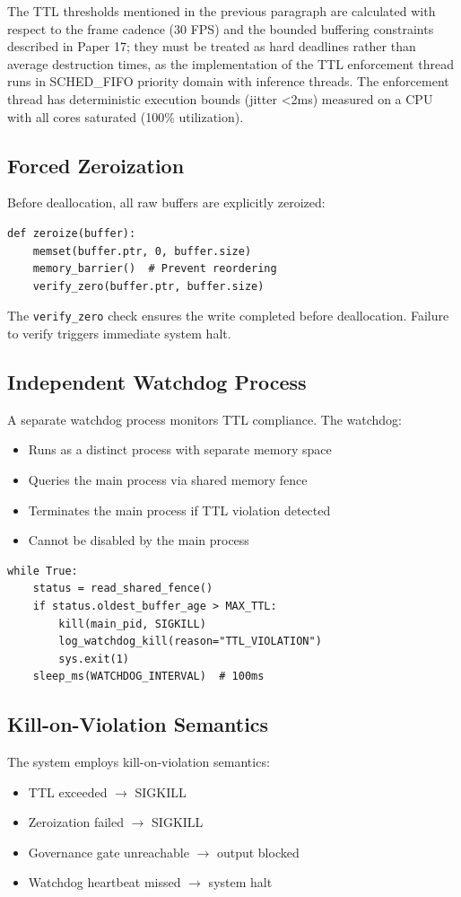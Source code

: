 \documentclass[conference]{IEEEtran}
\begin{document}
The TTL thresholds mentioned in the previous paragraph are calculated with respect to the frame cadence (30 FPS) and the bounded buffering constraints described in Paper 17; they must be treated as hard deadlines rather than average destruction times, as the implementation of the TTL enforcement thread runs in SCHED\_FIFO priority domain with inference threads. The enforcement thread has deterministic execution bounds (jitter <2ms) measured on a CPU with all cores saturated (100\% utilization).

\subsection{Forced Zeroization}
Before deallocation, all raw buffers are explicitly zeroized:

\begin{lstlisting}[caption={Zeroization Procedure}]
def zeroize(buffer):
    memset(buffer.ptr, 0, buffer.size)
    memory_barrier()  # Prevent reordering
    verify_zero(buffer.ptr, buffer.size)
\end{lstlisting}

The \texttt{verify\_zero} check ensures the write completed before deallocation. Failure to verify triggers immediate system halt.

\subsection{Independent Watchdog Process}
A separate watchdog process monitors TTL compliance. The watchdog:
\begin{itemize}
    \item Runs as a distinct process with separate memory space
    \item Queries the main process via shared memory fence
    \item Terminates the main process if TTL violation detected
    \item Cannot be disabled by the main process
\end{itemize}

\begin{lstlisting}[caption={Watchdog Logic}]
while True:
    status = read_shared_fence()
    if status.oldest_buffer_age > MAX_TTL:
        kill(main_pid, SIGKILL)
        log_watchdog_kill(reason="TTL_VIOLATION")
        sys.exit(1)
    sleep_ms(WATCHDOG_INTERVAL)  # 100ms
\end{lstlisting}

\subsection{Kill-on-Violation Semantics}
The system employs kill-on-violation semantics:
\begin{itemize}
    \item TTL exceeded $\rightarrow$ SIGKILL
    \item Zeroization failed $\rightarrow$ SIGKILL
    \item Governance gate unreachable $\rightarrow$ output blocked
    \item Watchdog heartbeat missed $\rightarrow$ system halt
\end{itemize}
\end{document}
